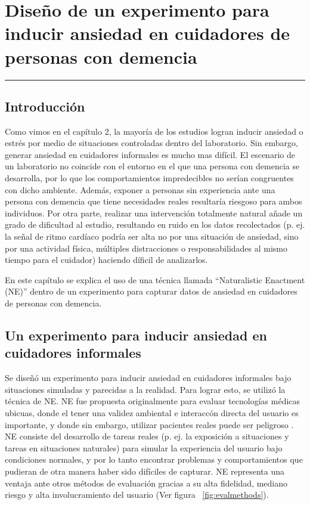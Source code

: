 \chapter{Dise\~no de un experimento para inducir ansiedad en cuidadores de personas con demencia}\label{capit:cap3}
\vspace{-2.0325ex}%
\noindent
\rule{\textwidth}{0.5pt}
\vspace{-5.5ex}%
\newcommand{\pushline}{\Indp}%
\section{Introducci\'on}\label{secc:introduction}

Como vimos en el cap\'itulo 2, la mayor\'ia de los estudios logran inducir ansiedad o estr\'es por medio de situaciones controladas dentro del laboratorio. Sin embargo, generar ansiedad en cuidadores informales es mucho mas dif\'icil. El escenario de un laboratorio no coincide con el entorno en el que una persona con demencia se desarrolla, por lo que los comportamientos impredecibles no ser\'ian congruentes con dicho ambiente. Adem\'as, exponer a personas sin experiencia ante una persona con demencia que tiene necesidades reales resultar\'ia riesgoso para ambos individuos. Por otra parte, realizar una intervenci\'on totalmente natural a\~nade un grado de dificultad al estudio, resultando en ruido en los datos recolectados (p. ej. la se\~nal de ritmo card\'iaco podr\'ia ser alta no por una situaci\'on de ansiedad, sino por una actividad f\'isica, m\'ultiples distracciones o responsabilidades al mismo tiempo para el cuidador) haciendo d\'ificil de analizarlos.

En este cap\'itulo se explica el uso de una t\'ecnica llamada ``Naturalistic Enactment (NE)'' \citep{Castro11} dentro de un experimento para capturar datos de ansiedad en cuidadores de personas con demencia.


\section{Un experimento para inducir ansiedad en cuidadores informales}\label{secc:experiment}
Se dise\~n\'o un experimento para inducir ansiedad en cuidadores informales bajo situaciones simuladas y parecidas a la realidad. Para lograr esto, se utiliz\'o la t\'ecnica de NE. NE fue propuesta originalmente para evaluar tecnolog\'ias m\'edicas ubicuas, donde el tener una validez ambiental e interacc\'on directa del usuario es importante, y donde sin embargo, utilizar pacientes reales puede ser peligroso \citep{Castro11}. NE consiste del desarrollo de tareas reales (p. ej. la exposici\'on a situaciones y tareas en situaciones naturales) para simular la experiencia del usuario bajo condiciones normales, y por lo tanto encontrar problemas y comportamientos que pudieran de otra manera haber sido dif\'iciles de capturar. NE representa una ventaja ante otros m\'etodos de evaluaci\'on gracias a su alta fidelidad, mediano riesgo y alta involucramiento del usuario (Ver figura ~\ref{fig:evalmethods}).

